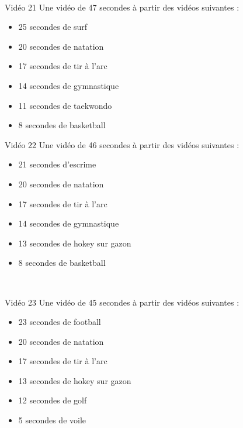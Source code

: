 \documentclass[10pt, a5paper,twoside]{article}
\begin{document}
\vfill

\clearpage
~
\vfill

\begin{card}[width = \textwidth, colback = olympicyellow, colframe = olympicyellow, bottomtitle = 2mm]{Vidéo 21}
  Une vidéo de 47 secondes à partir des vidéos suivantes :
  \vspace{-1mm}\begin{itemize}
    \item 25 secondes de surf
    \item 20 secondes de natation
    \item 17 secondes de tir à l'arc
    \item 14 secondes de gymnastique
    \item 11 secondes de taekwondo
    \item 8 secondes de basketball
  \end{itemize}
\end{card}

\vfill

\begin{card}[width = \textwidth, colback = olympicyellow, colframe = olympicyellow, bottomtitle = 2mm]{Vidéo 22}
  Une vidéo de 46 secondes à partir des vidéos suivantes :
  \vspace{-1mm}\begin{itemize}
    \item 21 secondes d'escrime
    \item 20 secondes de natation
    \item 17 secondes de tir à l'arc
    \item 14 secondes de gymnastique
    \item 13 secondes de hokey sur gazon
    \item 8 secondes de basketball
  \end{itemize}
\end{card}

\vfill

\clearpage
~
\vfill

\begin{card}[width = \textwidth, colback = olympicyellow, colframe = olympicyellow, bottomtitle = 2mm]{Vidéo 23}
  Une vidéo de 45 secondes à partir des vidéos suivantes :
  \vspace{-1mm}\begin{itemize}
    \item 23 secondes de football
    \item 20 secondes de natation
    \item 17 secondes de tir à l'arc
    \item 13 secondes de hokey sur gazon
    \item 12 secondes de golf
    \item 5 secondes de voile
  \end{itemize}
\end{card}
\end{document}
